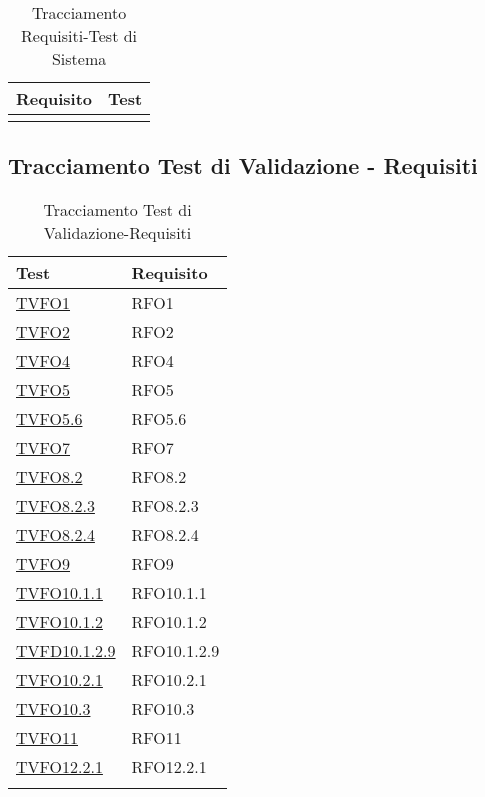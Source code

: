 \normalsize
\begin{longtable}{|>{\centering}m{5cm}|m{5cm}<{\centering}|}
	\hline \rowcolor{Gray}
	\textbf{Requisito} & \textbf{Test}\\
	\hline
	\endhead

	\caption[Tracciamento Requisiti-Test di Sistema]{Tracciamento Requisiti-Test di Sistema}
	\label{tabella:requi-ts}
\end{longtable}
\clearpage

\subsection{Tracciamento Test di Validazione - Requisiti}

\normalsize
\begin{longtable}{|>{\centering}m{5cm}|m{5cm}<{\centering}|}
	\hline \rowcolor{Gray}
	\textbf{Test} & \textbf{Requisito}\\
	\hline
	\endhead
	\hyperlink{TVFO1}{TVFO1} & RFO1\\ \hline
	\hyperlink{TVFO2}{TVFO2} & RFO2\\ \hline
	\hyperlink{TVFO4}{TVFO4} & RFO4\\ \hline
	\hyperlink{TVFO5}{TVFO5} & RFO5\\ \hline
	\hyperlink{TVFO5.6}{TVFO5.6} & RFO5.6\\ \hline
	\hyperlink{TVFO7}{TVFO7} & RFO7\\ \hline
	\hyperlink{TVFO8.2}{TVFO8.2} & RFO8.2\\ \hline
	\hyperlink{TVFO8.2.3}{TVFO8.2.3} & RFO8.2.3\\ \hline
	\hyperlink{TVFO8.2.4}{TVFO8.2.4} & RFO8.2.4\\ \hline
	\hyperlink{TVFO9}{TVFO9} & RFO9\\ \hline
	\hyperlink{TVFO10.1.1}{TVFO10.1.1} & RFO10.1.1\\ \hline
	\hyperlink{TVFO10.1.2}{TVFO10.1.2} & RFO10.1.2\\ \hline
	\hyperlink{TVFD10.1.2.9}{TVFD10.1.2.9} & RFO10.1.2.9\\ \hline
	\hyperlink{TVFO10.2.1}{TVFO10.2.1} & RFO10.2.1\\ \hline
	\hyperlink{TVFO10.3}{TVFO10.3} & RFO10.3\\ \hline
	\hyperlink{TVFO11}{TVFO11} & RFO11\\ \hline
	\hyperlink{TVFO12.2.1}{TVFO12.2.1} & RFO12.2.1\\ \hline
	\caption[Tracciamento Test di Validazione-Requisiti]{Tracciamento Test di Validazione-Requisiti}
	\label{tabella:tv-requi}
\end{longtable}
\clearpage
